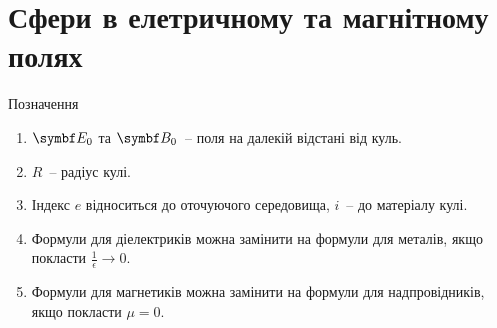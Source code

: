 \newpage
\section{Сфери в елетричному та магнітному полях}

\begin{center}
	Позначення
\end{center}
\begin{enumerate}\small
	\item $\Efield_0$ та $\Bfield_0$~-- поля на далекій відстані від куль.
	\item $R$~-- радіус кулі.
	\item Індекс $e$ відноситься до оточуючого середовища, $i$~-- до матеріалу кулі.
	\item Формули для діелектриків можна замінити на формули для металів, якщо покласти $\frac{1}{\epsilon} \to 0$.
	\item Формули для магнетиків можна замінити на формули для надпровідників, якщо покласти $\mu = 0$.
\end{enumerate}

